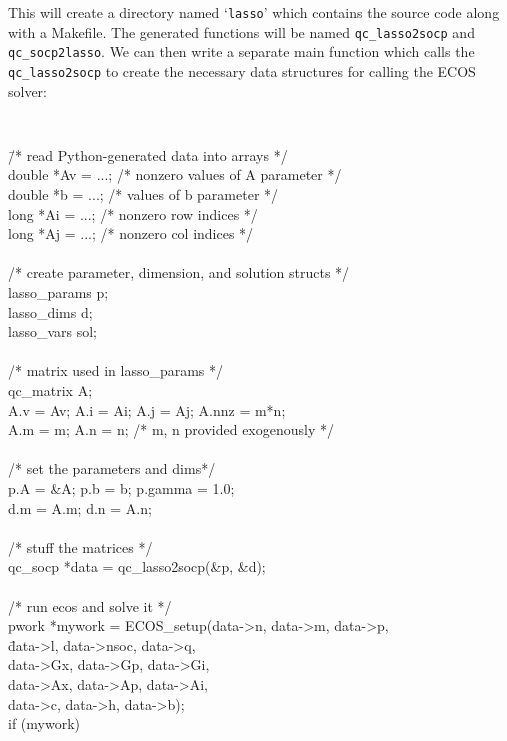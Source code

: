 \documentclass[11pt]{article}
\begin{document}
This will create a directory named `{\tt lasso}' which contains the source code 
along with a Makefile. The
generated functions will be named {\tt qc\_lasso2socp} and {\tt qc\_socp2lasso}.
We can then write a separate main function which calls the {\tt qc\_lasso2socp}
to create the necessary data structures for calling the ECOS solver:
{\tt
\begin{tabbing}
\qquad \= /* read Python-generated data into arrays */ \\
\> double *Av = ...; /* nonzero values of A parameter */\\
\> double *b = ...;  /* values of b parameter */\\
\> long *Ai = ...;   /* nonzero row indices */\\
\> long *Aj = ...;   /* nonzero col indices */\\
\\
\> /* create parameter, dimension, and solution structs */\\
\> lasso\_params p;\\
\> lasso\_dims d;\\
\> lasso\_vars sol;\\
\\
\> /* matrix used in lasso\_params */\\
\> qc\_matrix A;\\
\> A.v = Av; A.i = Ai; A.j = Aj; A.nnz = m*n;\\
\> A.m = m; A.n = n; /* m, n provided exogenously */ \\
\\
\> /* set the parameters and dims*/\\
\> p.A = \&A; p.b = b; p.gamma = 1.0;\\
\> d.m = A.m; d.n = A.n;\\
\\
\> /* stuff the matrices */\\
\> qc\_socp *data = qc\_lasso2socp(\&p, \&d);\\
\\
\> /* run ecos and solve it */\\
\> pwork *mywork = ECOS\_setup(data->n, data->m, data->p,\\
\> \quad \= data->l, data->nsoc, data->q,\\
\> \> data->Gx, data->Gp, data->Gi,\\
\> \> data->Ax, data->Ap, data->Ai,\\
\> \> data->c, data->h, data->b);\\
\> if (mywork)\\

\end{tabbing}}
\end{document}

